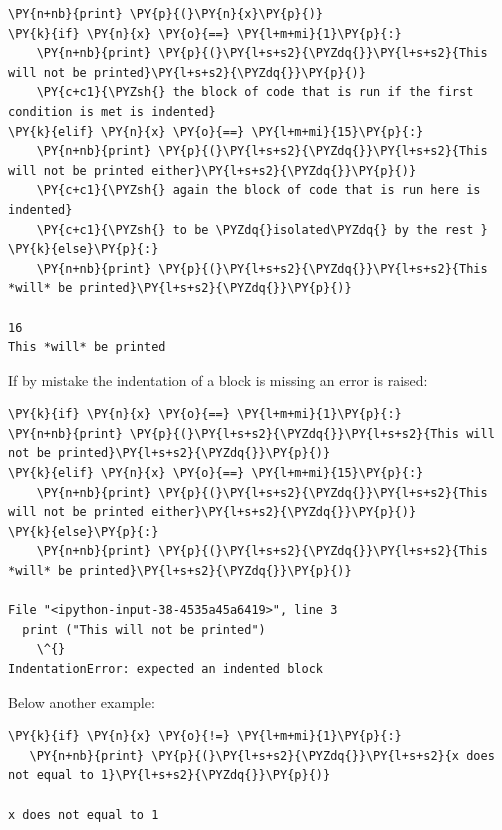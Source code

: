 \begin{codebox}            
\begin{Verbatim}[commandchars=\\\{\}]
\PY{n+nb}{print} \PY{p}{(}\PY{n}{x}\PY{p}{)}
\PY{k}{if} \PY{n}{x} \PY{o}{==} \PY{l+m+mi}{1}\PY{p}{:} 
    \PY{n+nb}{print} \PY{p}{(}\PY{l+s+s2}{\PYZdq{}}\PY{l+s+s2}{This will not be printed}\PY{l+s+s2}{\PYZdq{}}\PY{p}{)} 
    \PY{c+c1}{\PYZsh{} the block of code that is run if the first condition is met is indented}
\PY{k}{elif} \PY{n}{x} \PY{o}{==} \PY{l+m+mi}{15}\PY{p}{:}
    \PY{n+nb}{print} \PY{p}{(}\PY{l+s+s2}{\PYZdq{}}\PY{l+s+s2}{This will not be printed either}\PY{l+s+s2}{\PYZdq{}}\PY{p}{)}
    \PY{c+c1}{\PYZsh{} again the block of code that is run here is indented}
    \PY{c+c1}{\PYZsh{} to be \PYZdq{}isolated\PYZdq{} by the rest }
\PY{k}{else}\PY{p}{:}
    \PY{n+nb}{print} \PY{p}{(}\PY{l+s+s2}{\PYZdq{}}\PY{l+s+s2}{This *will* be printed}\PY{l+s+s2}{\PYZdq{}}\PY{p}{)}

16
This *will* be printed
\end{Verbatim}
\end{codebox}

If by mistake the indentation of a block is missing an error is raised:
\begin{codebox}            
\begin{Verbatim}[commandchars=\\\{\}]
\PY{k}{if} \PY{n}{x} \PY{o}{==} \PY{l+m+mi}{1}\PY{p}{:} 
\PY{n+nb}{print} \PY{p}{(}\PY{l+s+s2}{\PYZdq{}}\PY{l+s+s2}{This will not be printed}\PY{l+s+s2}{\PYZdq{}}\PY{p}{)}
\PY{k}{elif} \PY{n}{x} \PY{o}{==} \PY{l+m+mi}{15}\PY{p}{:}
    \PY{n+nb}{print} \PY{p}{(}\PY{l+s+s2}{\PYZdq{}}\PY{l+s+s2}{This will not be printed either}\PY{l+s+s2}{\PYZdq{}}\PY{p}{)}
\PY{k}{else}\PY{p}{:}
    \PY{n+nb}{print} \PY{p}{(}\PY{l+s+s2}{\PYZdq{}}\PY{l+s+s2}{This *will* be printed}\PY{l+s+s2}{\PYZdq{}}\PY{p}{)}

File "<ipython-input-38-4535a45a6419>", line 3
  print ("This will not be printed")
    \^{}
IndentationError: expected an indented block
\end{Verbatim}
\end{codebox}

Below another example:
\begin{codebox}            
\begin{Verbatim}[commandchars=\\\{\}]
\PY{k}{if} \PY{n}{x} \PY{o}{!=} \PY{l+m+mi}{1}\PY{p}{:}
   \PY{n+nb}{print} \PY{p}{(}\PY{l+s+s2}{\PYZdq{}}\PY{l+s+s2}{x does not equal to 1}\PY{l+s+s2}{\PYZdq{}}\PY{p}{)}

x does not equal to 1
\end{Verbatim}
\end{codebox}


